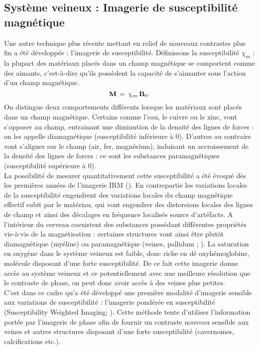 \subsection{Système veineux : Imagerie de susceptibilité magnétique}
Une autre technique plus récente mettant en relief de nouveaux contrastes plus fin a été développée : l’imagerie de susceptibilité. Définissons la susceptibilité $\chi_m$ : la plupart des matériaux placés dans un champ magnétique se comportent comme des aimants, c’est-à-dire qu’ils possèdent la capacité de s’aimanter sous l’action d’un champ magnétique. 
\begin{equation}
\bold{M}\,=\,\chi_m\,\bold{B}_0.
\end{equation}
On distingue deux comportements différents lorsque les matériaux sont placés dans un champ magnétique. Certains comme l’eau, le cuivre ou le zinc, vont s’opposer au champ, entrainant une diminution de la densité des lignes de forces : on les appelle diamagnétique (susceptibilité inférieure à 0). D’autres au contraire vont s’aligner sur le champ (air, fer, magnésium), induisant un accroissement de la densité des lignes de forces : ce sont les substances paramagnétiques (susceptibilité supérieure à 0).\\
La possibilité de mesurer quantitativement cette susceptibilité a été évoqué dès les premières années de l’imagerie IRM (\cite{Young1987}). En contrepartie les variations locales de la susceptibilité engendrent des variations locales du champ magnétique effectif subit par le matériau, qui vont engendrer des distorsions locales des lignes de champ et ainsi des décalages en fréquence localisés source d’artéfacts. A l’intérieur du cerveau coexistent des substances possédant différentes propriétés vis-à-vis de la magnétisation : certaines structures vont ainsi être plutôt diamagnétique (myéline) ou paramagnétique (veines, pallidum ; \cite{Wang_Liu_2014}). La saturation en oxygène dans le système veineux est faible, donc riche en dé oxyhémoglobine, molécule disposant d’une forte susceptibilité. De ce fait cette imagerie donne accès au système veineux et ce potentiellement avec une meilleure résolution que le contraste de phase, on peut donc avoir accès à des veines plus petites.\\
C’est dans ce cadre qu’a été développé une première modalité d’imagerie sensible aux variations de susceptibilité : l’imagerie pondérée en susceptibilité (Susceptibility Weighted Imaging; \cite{Reichenbach2001}). Cette méthode tente d’utiliser l’information portée par l’imagerie de phase afin de fournir un contraste nouveau sensible aux veines et autres structures disposant d’une forte susceptibilité (cavernomes, calcifications etc.).\\
